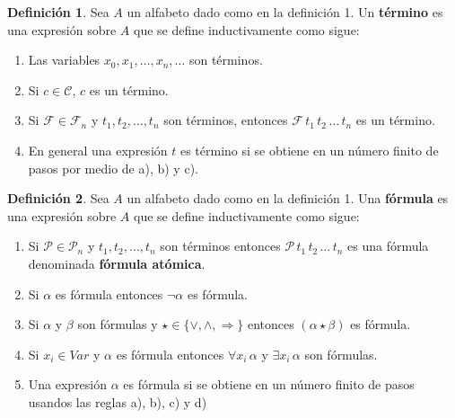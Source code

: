 \documentclass[a4paper,11pt]{article}
\theoremstyle{definition}
\newtheorem{defn}{Definición}[section]
\theoremstyle{remark}
\begin{document}
\begin{defn}
    Sea $A$ un alfabeto dado como en la definición 1. Un \textbf{término} es una expresión
    sobre $A$ que se define inductivamente como sigue:
    
    \begin{enumerate}[label=\emph{\alph*})]
        \item Las variables $x_0, x_1, \dots, x_n, \dots$ son términos.
        
        \item Si $c \in \mathcal C$, $c$ es un término.
        
        \item Si $\mathcal F \in \mathcal F_n$ y $t_1, t_2, \dots, t_n$ son términos, entonces
        $\mathcal F\,t_1\,t_2\,\dots\,t_n$ es un término.
        
        \item En general una expresión $t$ es término si se obtiene en un número finito de pasos
        por medio de a), b) y c).
    \end{enumerate}
\end{defn}

\begin{defn}
    Sea $A$ un alfabeto dado como en la definición 1. Una \textbf{fórmula} es una expresión sobre $A$
    que se define inductivamente como sigue:
    
    \begin{enumerate}[label=\emph{\alph*})]
        \item Si $\mathcal P \in \mathcal P_n$ y $t_1, t_2, \dots, t_n$ son términos entonces
        $\mathcal P\,t_1\,t_2\,\dots\,t_n$ es una fórmula denominada \textbf{fórmula atómica}.
        
        \item Si $\alpha$ es fórmula entonces $\lnot\alpha$ es fórmula.
        
        \item Si $\alpha$ y $\beta$ son fórmulas y $\star \in \{\lor, \land, \Rightarrow\}$
        entonces $(\alpha \star \beta)$ es fórmula.
        
        \item Si $x_i \in Var$ y $\alpha$ es fórmula entonces $\forall x_i\,\alpha$ y $\exists x_i\,\alpha$
        son fórmulas.
        
        \item Una expresión $\alpha$ es fórmula si se obtiene en un número finito de
        pasos usandos las reglas a), b), c) y d)
    \end{enumerate}
\end{defn}
\end{document}
